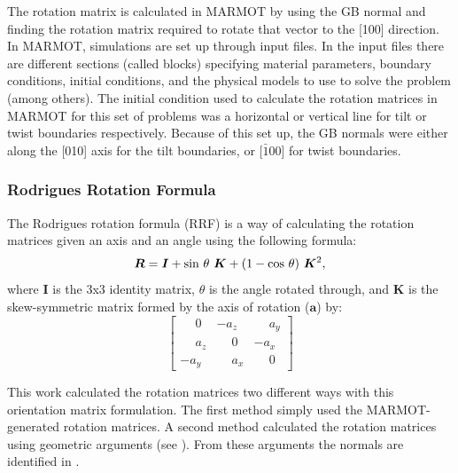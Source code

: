 \documentclass[12pt]{report}
\begin{document}
The rotation matrix is calculated in MARMOT by using the GB normal and finding the rotation matrix required to rotate that vector to the [100] direction.  In MARMOT, simulations are set up through input files.  In the input files there are different sections (called blocks) specifying material parameters, boundary conditions, initial conditions, and the physical models to use to solve the problem (among others).  The initial condition used to calculate the rotation matrices in MARMOT for this set of problems was a horizontal or vertical line for tilt or twist boundaries respectively.  Because of this set up, the GB normals were either along the [010] axis for the tilt boundaries, or [$\bar{1}$00] for twist boundaries.

\subsubsection{Rodrigues Rotation Formula\label{PQ:RRF}}
The Rodrigues rotation formula\cite{belongie2006} (RRF) is a way of calculating the rotation matrices given an axis and an angle using the following formula:
\begin{equation}
\label{eq:rrf}
\bm{R} = \bm{I} + \textnormal{sin}\ \theta\ \bm{K} + (1 - \textnormal{cos}\ \theta)\ \bm{K}^2,
\end{equation}
where $\bm{I}$ is the 3x3 identity matrix, $\theta$ is the angle rotated through, and $\bm{K}$ is the skew-symmetric matrix formed by the axis of rotation ($\bm{a}$) by:
\begin{equation}
\label{eq:skewSymMat}
\left[
\begin{array}{ccc}
\phantom{-}0 & -a_z & \phantom{-}a_y \\
\phantom{-}a_z & \phantom{-}0 & -a_x \\
-a_y & \phantom{-}a_x & \phantom{-}0
\end{array}
\right]
\end{equation}

This work calculated the rotation matrices two different ways with this orientation matrix formulation.  The first method simply used the MARMOT-generated rotation matrices.  A second method calculated the rotation matrices using geometric arguments (see ).  From these arguments the normals are identified in .
\end{document}
